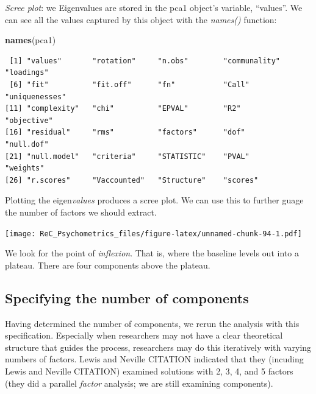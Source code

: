 \documentclass[
  english,
]{book}
\newenvironment{Shaded}{\begin{snugshade}}{\end{snugshade}}
\newcommand{\CommentTok}[1]{\textcolor[rgb]{0.56,0.35,0.01}{\textit{#1}}}
\newcommand{\DataTypeTok}[1]{\textcolor[rgb]{0.13,0.29,0.53}{#1}}
\newcommand{\KeywordTok}[1]{\textcolor[rgb]{0.13,0.29,0.53}{\textbf{#1}}}
\newcommand{\NormalTok}[1]{#1}
\newcommand{\OperatorTok}[1]{\textcolor[rgb]{0.81,0.36,0.00}{\textbf{#1}}}
\newcommand{\StringTok}[1]{\textcolor[rgb]{0.31,0.60,0.02}{#1}}
\begin{document}
\emph{Scree plot}: we
Eigenvalues are stored in the pca1 object's variable, ``values''. We can see all the values captured by this object with the \emph{names()} function:

\begin{Shaded}
\begin{Highlighting}[]
\KeywordTok{names}\NormalTok{(pca1)}
\end{Highlighting}
\end{Shaded}

\begin{verbatim}
 [1] "values"       "rotation"     "n.obs"        "communality"  "loadings"    
 [6] "fit"          "fit.off"      "fn"           "Call"         "uniquenesses"
[11] "complexity"   "chi"          "EPVAL"        "R2"           "objective"   
[16] "residual"     "rms"          "factors"      "dof"          "null.dof"    
[21] "null.model"   "criteria"     "STATISTIC"    "PVAL"         "weights"     
[26] "r.scores"     "Vaccounted"   "Structure"    "scores"      
\end{verbatim}

Plotting the eigen\emph{values} produces a scree plot. We can use this to further guage the number of factors we should extract.

\begin{Shaded}
\end{Shaded}

\texttt{[image: ReC\_Psychometrics\_files/figure-latex/unnamed-chunk-94-1.pdf]}

We look for the point of \emph{inflexion}. That is, where the baseline levels out into a plateau. There are four components above the plateau.

\hypertarget{specifying-the-number-of-components}{%
\subsection{Specifying the number of components}\label{specifying-the-number-of-components}}

Having determined the number of components, we rerun the analysis with this specification. Especially when researchers may not have a clear theoretical structure that guides the process, researchers may do this iteratively with varying numbers of factors. Lewis and Neville CITATION indicated that they (incuding Lewis and Neville CITATION) examined solutions with 2, 3, 4, and 5 factors (they did a parallel \emph{factor} analysis; we are still examining components).
\end{document}
